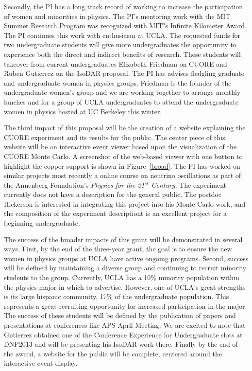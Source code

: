 Secondly, the PI has a long track record of working to increase the participation of women
and minorities in physics. The PI's mentoring work with the MIT Summer Research Program was recognized with MIT"s Infinite Kilometer Award. The PI continues this work with enthusiasm at UCLA. The requested funds for two undergraduate students will give more undergraduates the opportunity to experience both the direct and indirect benefits of research. These students will takeover from current undergraduates Elizabeth Friedman on CUORE and Ruben Gutierrez on the IsoDAR proposal. The PI has advises fledgling graduate and undergraduate women in physics groups. Friedman is the founder of the undergraduate women's group and we are working together to arrange monthly lunches and for a group of UCLA undergraduates to attend the undergraduate women in physics hosted at UC Berkeley this winter.

The third impact of this proposal will be the creation of a website explaining the CUORE experiment and its results for the public. The center piece of this website will be an interactive event viewer based upon the visualization of the CUORE Monte Carlo. A screenshot of the web-based viewer with one button to highlight the copper support is shown in Figure~\ref{broad}. The PI has worked on similar projects most recently a online course on neutrino oscillations as part of the Annenberg Foundation's \textit{Physics for the 21$^{st}$ Century}. The experiment currently does not have a description for the general public. The postdoc Hickerson is interested in integrating this project into his Monte Carlo work, and the composition of the experiment descriptiont is an excellent project for a beginning undergraduate.

The success of the broader impacts of this grant will be demonstrated in several ways.   First, by the end of the three-year grant, the goal is to ensure the new women in physics groups at UCLA have active ongoing programs.  Second, success will be defined by maintaining a diverse group and continuing to recruit minority students to the group. Currently, UCLA has a 10\% minority population within the physics major in which to advertise. However, one of UCLA's great strengths is its large hispanic community, 17\% of the undergraduate population. This represents a great recruiting opportunity for increased participation in the major. The success  of these students will be defined by the publication of papers and presentations at  conferences like APS April Meeting. We are excited to note that  Gutierrez obtained one of the Conference Experience for Undergraduate slots at DNP2013 and will be presenting his IsoDAR work there. Finally by the end of the award, a website for the public will be complete, centered around the interactive event display.

